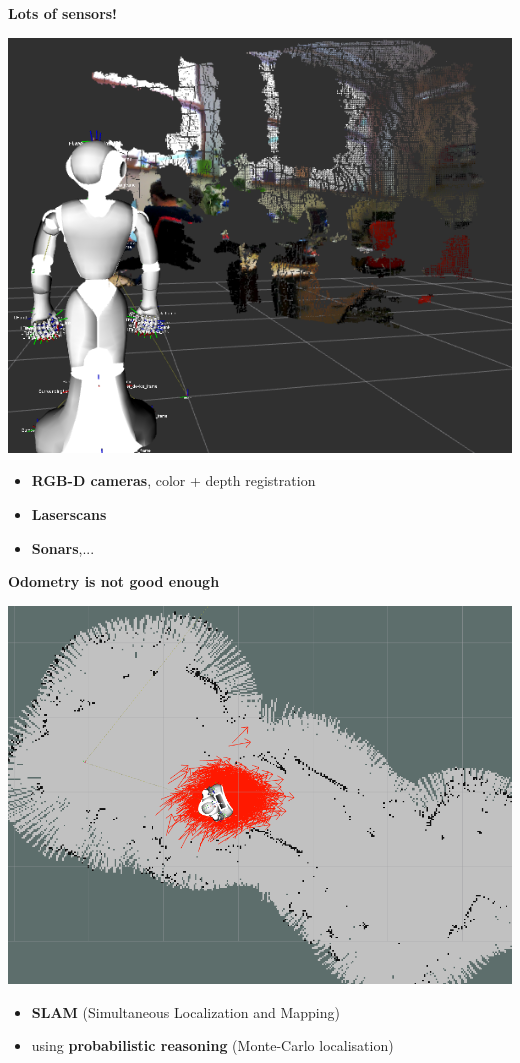 \documentclass[compress]{beamer}
\begin{document}
\begin{frame}[plain]

    \begin{center}

        \textbf{Lots of sensors!}

        \includegraphics[width=0.6\linewidth]{rgbd_pepper}

    \end{center}

        \begin{itemize}
            \item \textbf{RGB-D cameras}, color + depth registration
            \item \textbf{Laserscans}
            \item \textbf{Sonars},...
        \end{itemize}

\end{frame}


\begin{frame}[plain]

    \begin{center}

        \textbf{Odometry is not good enough}

        \includegraphics[width=0.6\linewidth]{localisation_pepper}

    \end{center}

        \begin{itemize}
            \item \textbf{SLAM} (Simultaneous Localization and Mapping)
            \item using \textbf{probabilistic reasoning} (Monte-Carlo localisation)
        \end{itemize}

\end{frame}
\end{document}
